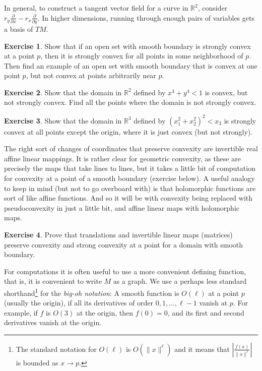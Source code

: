 \documentclass[12pt,openany]{book}
\newcommand{\snorm}[1]{\lVert {#1} \rVert}
\newcommand{\abs}[1]{\left\lvert {#1} \right\rvert}
\newcommand{\R}{{\mathbb{R}}}
\newcommand{\myindex}[1]{#1\index{#1}}
\theoremstyle{plain}
\theoremstyle{remark}
\theoremstyle{definition}
\newenvironment{exbox}{%
    \def\FrameCommand{\vrule width 1pt \relax\hspace{10pt}}%
    \MakeFramed{\advance\hsize-\width\FrameRestore}%
}{%
    \endMakeFramed
}
\theoremstyle{exercise}
\newtheorem{exercise}{Exercise}[section]
\theoremstyle{example}
\begin{document}
In general, to construct a tangent vector field for
a curve in $\R^2$,
consider
$r_y \frac{\partial}{\partial x} - r_x \frac{\partial}{\partial y}$.  In
higher dimensions, running through enough pairs of variables gets
a basis of $TM$.

\begin{exbox}
\begin{exercise}
Show that if an open set with smooth boundary is strongly convex at a point $p$,
then it is strongly convex for all points in some neighborhood of $p$.
Then find an example of
an open set with smooth boundary that is convex at one point $p$,
but not convex at points arbitrarily near $p$.
\end{exercise}

\begin{exercise}
Show that the domain in $\R^2$ defined by $x^4+y^4 < 1$ is convex, but not strongly convex.
Find all the points where the domain is not strongly convex.
\end{exercise}

\begin{exercise}
Show that the domain in $\R^3$ defined by ${(x_1^2+x_2^2)}^2 < x_3$ is
strongly convex at all points except the origin, where it is just convex
(but not strongly).
\end{exercise}
\end{exbox}

The right sort of changes of coordinates that preserve convexity are
invertible real affine linear mappings.
It is rather clear for geometric convexity, as these are precisely the maps
that take lines to lines,
but it takes a little bit of computation for convexity at a point of
a smooth boundary (exercise below).
A useful analogy to keep in mind (but not to go overboard with) is that
holomorphic functions are sort of like affine functions.  And so it will be
with convexity being replaced with pseudoconvexity in just a little bit, and
affine linear maps with holomorphic maps.

\begin{exbox}
\begin{exercise}
Prove that translations and invertible linear maps (matrices) preserve
convexity and strong convexity at a point for a domain with smooth boundary.
\end{exercise}
\end{exbox}

For computations it is often useful to use a more convenient
defining function, that is, it is convenient to write $M$ as a graph.
We use
 a perhaps less standard shorthand\footnote{%
The standard notation for $O(\ell)$ is $O(\snorm{x}^{\ell})$ and
it means that
$\abs{\frac{f(x)}{\snorm{x}^\ell}}$ is bounded as $x \to p$.}
for the
%
\emph{\myindex{big-oh notation}}:
A smooth function is $O(\ell)$ at a point $p$ (usually the origin),
if all its derivatives of order $0, 1, \ldots,  \ell-1$ vanish at $p$.
For example, if $f$ is $O(3)$ at the origin,
then $f(0)=0$, and its first and second derivatives vanish at the origin.
\end{document}
